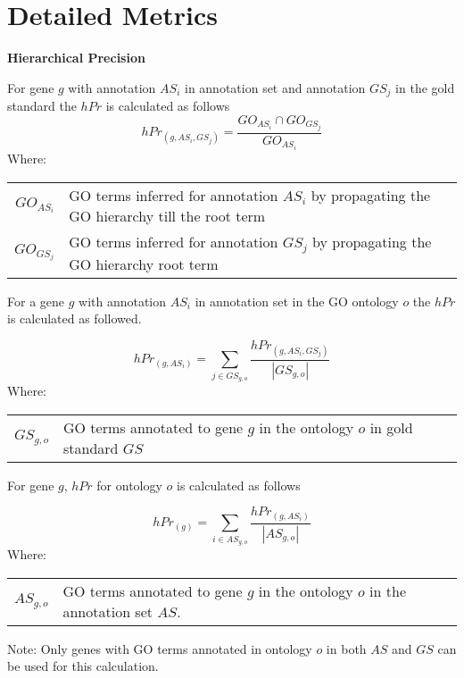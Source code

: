   \section{Detailed Metrics}
  \label{sec:detailes_metrics}
  
\textbf{Hierarchical Precision}

For gene $g$ with annotation $AS_i$ in annotation set and annotation $GS_j$ in the gold standard the $hPr$ is calculated as follows
\begin{equation}
    hPr_{(g,AS_{i},GS_{j})} = \frac{GO_{AS_{i}} \cap GO_{GS_{j}}} {GO_{AS_{i}}}
\end{equation}
Where:

\begin{tabularx}{0.95\textwidth}{r@{\ :\ }X}
    $GO_{AS_{i}}$ & GO terms inferred for annotation $AS_i$ by propagating the GO hierarchy till the root term  \\
    $GO_{GS_{j}}$ & GO terms inferred for annotation $GS_j$ by propagating the GO hierarchy root term
\end{tabularx}

For a gene $g$ with annotation $AS_i$ in annotation set in the GO ontology $o$ the $hPr$ is calculated as followed.

\begin{equation}
    hPr_{(g,AS_{i})} = \sum_{j \in GS_{g,o}} 
    \frac{ hPr_{(g,AS_{i},GS_{j})}}
        {|GS_{g,o}|}
\end{equation}
Where:

\begin{tabularx}{0.95\textwidth}{r@{\ :\ }X}
    $GS_{g,o}$ & GO terms annotated to gene $g$ in the ontology $o$ in gold standard $GS$
\end{tabularx}

For gene $g$, $hPr$ for ontology $o$ is calculated as follows

\begin{equation}
    hPr_{(g)} =   \sum_{i \in AS_{g,o}}
    \frac{ hPr_{(g,AS_{i})}}
        {|AS_{g,o}|}
\end{equation}
Where:

\begin{tabularx}{0.95\textwidth}{r@{\ :\ }X}
    $AS_{g,o}$ & GO terms annotated to gene $g$ in the  ontology $o$ in the annotation set $AS$.
\end{tabularx}

Note: Only genes with GO terms annotated in ontology $o$ in both $AS$ and $GS$ can be used for this calculation.


